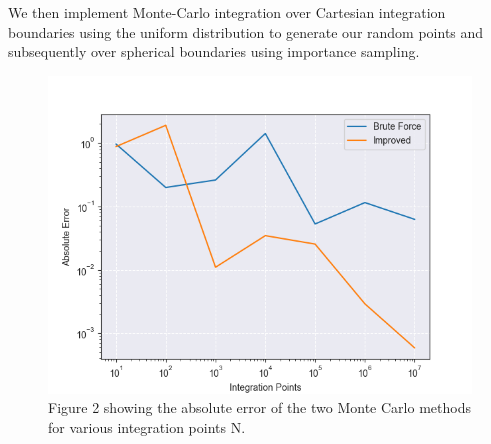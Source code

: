 \documentclass{emulateapj}
\begin{document}
 We then implement Monte-Carlo integration over Cartesian integration boundaries using the uniform distribution to generate our random points and subsequently over spherical boundaries using importance sampling.
\begin{figure}[H]
    \centering
    \includegraphics [scale=0.5]{monteerror.png}
    \caption{Figure 2 showing the absolute error of the two Monte Carlo methods for various integration points N.}
    \label{fig:fig2}
\end{figure}
\end{document}
